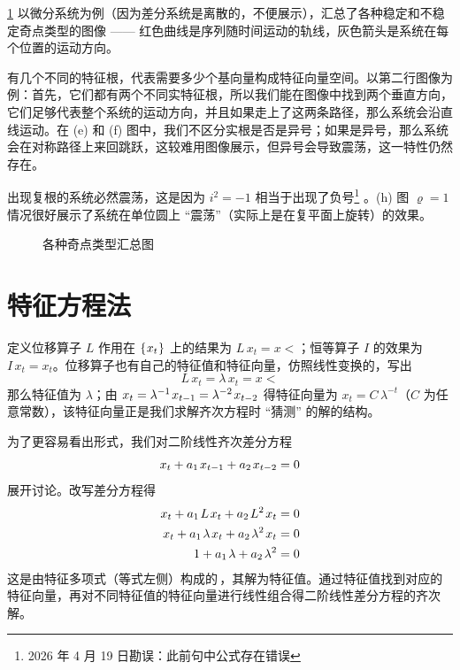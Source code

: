 \ref{fig:Sing} 以微分系统为例（因为差分系统是离散的，不便展示），汇总了各种稳定和不稳定奇点类型的图像 —— 红色曲线是序列随时间运动的轨线，灰色箭头是系统在每个位置的运动方向。

有几个不同的特征根，代表需要多少个基向量构成特征向量空间。以第二行图像为例：首先，它们都有两个不同实特征根，所以我们能在图像中找到两个垂直方向，它们足够代表整个系统的运动方向，并且如果走上了这两条路径，那么系统会沿直线运动。在 (e) 和 (f) 图中，我们不区分实根是否是异号；如果是异号，那么系统会在对称路径上来回跳跃，这较难用图像展示，但异号会导致震荡，这一特性仍然存在。

出现复根的系统必然震荡，这是因为 \(i^2=-1\) 相当于出现了负号\footnote{2026 年 4 月 19 日勘误：此前句中公式存在错误} 。(h) 图 \(\varrho=1\) 情况很好展示了系统在单位圆上 “震荡”（实际上是在复平面上旋转）的效果。

\begin{figure}[H]
  \caption{各种奇点类型汇总图}
  \label{fig:Sing}
\end{figure}


\BeginChapterAppendix

\section{特征方程法}{\label{sec:CharEquMethod}}

定义位移算子 \(L\) 作用在 \(\left\{\mspace{1mu} x_t\mspace{1mu}\right\}\) 上的结果为 \(L\,x_t = x\lt\)；恒等算子 \(I\) 的效果为 \(I \, x_t=x_t\)。位移算子也有自己的特征值和特征向量，仿照线性变换的，写出
\begin{equation}
    L\,x_t=\lambda\,x_t=x\lt
\end{equation}
那么特征值为 \(\lambda\)；由 \(x_t=\lambda^{-1}\,x\lt=\lambda^{-2}\,x\llt\) 得特征向量为 \(x_t=C\,\lambda^{-t}\)（\(C\) 为任意常数），该特征向量正是我们求解齐次方程时 “猜测” 的解的结构。

为了更容易看出形式，我们对二阶线性齐次差分方程
\begin{equation}
    x_t + a_1\,x\lt + a_2\,x\llt=0
\end{equation}
展开讨论。改写差分方程得
\begin{align}
    x_t + a_1\,L\,x_t + a_2\,L^2\,x_t &= 0\notag\\
    x_t + a_1\,\lambda\,x_t + a_2\,\lambda^2\,x_t &= 0\notag\\
    1 + a_1\,\lambda + a_2\,\lambda^2 &= 0
\end{align}
这是由特征多项式（等式左侧）构成的\,，其解为特征值。通过特征值找到对应的特征向量，再对不同特征值的特征向量进行线性组合得二阶线性差分方程的齐次解。

